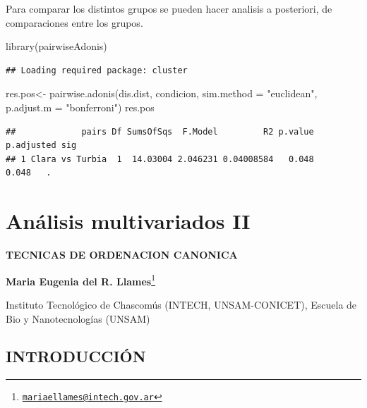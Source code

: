 \documentclass[
]{book}
\newenvironment{Shaded}{\begin{snugshade}}{\end{snugshade}}
\newcommand{\AttributeTok}[1]{\textcolor[rgb]{0.77,0.63,0.00}{#1}}
\newcommand{\FunctionTok}[1]{\textcolor[rgb]{0.00,0.00,0.00}{#1}}
\newcommand{\NormalTok}[1]{#1}
\newcommand{\OtherTok}[1]{\textcolor[rgb]{0.56,0.35,0.01}{#1}}
\newcommand{\StringTok}[1]{\textcolor[rgb]{0.31,0.60,0.02}{#1}}
\begin{document}
Para comparar los distintos grupos se pueden hacer analisis a posteriori, de comparaciones entre los grupos.

\begin{Shaded}
\begin{Highlighting}[]
\FunctionTok{library}\NormalTok{(pairwiseAdonis)}
\end{Highlighting}
\end{Shaded}

\begin{verbatim}
## Loading required package: cluster
\end{verbatim}

\begin{Shaded}
\begin{Highlighting}[]
\NormalTok{res.pos}\OtherTok{\textless{}{-}} \FunctionTok{pairwise.adonis}\NormalTok{(dis.dist, condicion, }\AttributeTok{sim.method =} \StringTok{"euclidean"}\NormalTok{, }\AttributeTok{p.adjust.m =} \StringTok{"bonferroni"}\NormalTok{)}
\NormalTok{res.pos}
\end{Highlighting}
\end{Shaded}

\begin{verbatim}
##             pairs Df SumsOfSqs  F.Model         R2 p.value p.adjusted sig
## 1 Clara vs Turbia  1  14.03004 2.046231 0.04008584   0.048      0.048   .
\end{verbatim}

\hypertarget{multi2}{%
\chapter{Análisis multivariados II}\label{multi2}}

\textbf{TECNICAS DE ORDENACION CANONICA}

\textbf{Maria Eugenia del R. Llames}\footnote{\href{mailto:mariaellames@intech.gov.ar}{\nolinkurl{mariaellames@intech.gov.ar}}}

Instituto Tecnológico de Chascomús (INTECH, UNSAM-CONICET), Escuela de Bio y Nanotecnologías (UNSAM)

\hypertarget{introducciuxf3n}{%
\section{INTRODUCCIÓN}\label{introducciuxf3n}}
\end{document}
